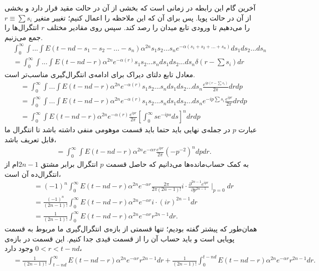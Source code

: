 آخرین گام این رابطه در زمانی است که بخشی از آن در حالت مقید قرار دارد و بخشی از آن در حالت پویا. پس برای آن که این ملاحظه را اعمال کنیم؛ تغییر متغیر
$r \equiv \sum s_i$
را می‌دهیم تا ورودی تابع میدان را رصد کند. سپس روی مقادیر مختلف $r$ انتگرال‌ها را جمع می‌زنیم.
\begin{align}
	& \int_{0}^{\infty}\int ... \int E(t - nd - s_1 - s_2 - ... - s_n)
	\alpha^{2n} s_1 s_2 ... s_n  e^{-\alpha(s_1 + s_2 + ... + s_n)} ds_1 ds_2 ... ds_n\\
	&= \int_{0}^{\infty}\int ... \int E(t - nd - r) \alpha^{2n} e^{-\alpha(r)} s_1 s_2 ... s_n ds_1 ds_2 ... ds_n \delta(r-\sum s_i) dr
\end{align}
معادل تابع دلتای دیراک برای ادامه‌ی انتگرال‌گیری مناسب‌تر است.
\begin{align}
	&= \int_{0}^{\infty}\int ... \int E(t - nd - r) \alpha^{2n} e^{-\alpha(r)} s_1 s_2 ... s_n ds_1 ds_2 ... ds_n \frac{e^{ip(r-\sum s_i)}}{2\pi} dr dp\\
	&= \int_{0}^{\infty}\int ... \int E(t - nd - r) \alpha^{2n} e^{-\alpha(r)} s_1 s_2 ... s_n ds_1 ds_2 ... ds_n e^{-ip\sum s_i} \frac{e^{ipr}}{2\pi} dr dp\\
	&= \int_{0}^{\infty}\int E(t - nd - r) \alpha^{2n} e^{-\alpha(r)} \frac{e^{ipr}}{2\pi} [\int_0^{\infty} s e^{-ips} ds]^n dr dp
\end{align}
عبارت $p$ در جمله‌ی نهایی باید حتما باید قسمت موهومی منفی داشته باشد تا انتگرال ما قابل تعریف باشد،
\begin{align}
	&= \int_{0}^{\infty}\int E(t - nd - r) \alpha^{2n} e^{-\alpha r} \frac{e^{ipr}}{2\pi} (-p^{-2})^n dp dr .
\end{align}
به کمک حساب‌مانده‌ها می‌دانیم که حاصل قسمت $p$ انتگرال برابر مشتق $ 2n-1 $ام از انتگرال‌ده آن است،
\begin{align}
	&= (-1)^n \int_{0}^{\infty} E(t - nd - r) \alpha^{2n} e^{-\alpha r} \frac{2\pi}{2\pi (2n-1)!} i \cdot \frac{\partial^{2n-1} e^{ipr}}{\partial p^{2n-1}}\mid_{p=0} dr\\
	&= \frac{(-1)^n}{(2n-1)!}\int_{0}^{\infty} E(t - nd - r) \alpha^{2n} e^{-\alpha r} i \cdot (ir)^{2n-1} dr\\
	&= \frac{1}{(2n-1)!} \int_{0}^{\infty} E(t - nd - r) \alpha^{2n} e^{-\alpha r} r^{2n-1} dr .
\end{align}	
همان‌طور که پیشتر گفته بودیم؛ تنها قسمتی از بازه‌ی انتگرال‌گیری ما مربوط به قسمت پویایی است و باید حساب آن را از قسمت قیدی جدا کنیم. این قسمت در بازه‌ی 
$0 < r < t-nd$
وجود دارد،
\begin{align}
	&= \frac{1}{(2n-1)!} \int_{t-nd}^{\infty} E(t - nd - r) \alpha^{2n} e^{-\alpha r} r^{2n-1} dr + \frac{1}{(2n-1)!} \int_{0}^{t - nd}E(t - nd - r) \alpha^{2n} e^{-\alpha r} r^{2n-1} dr	.
\end{align}
